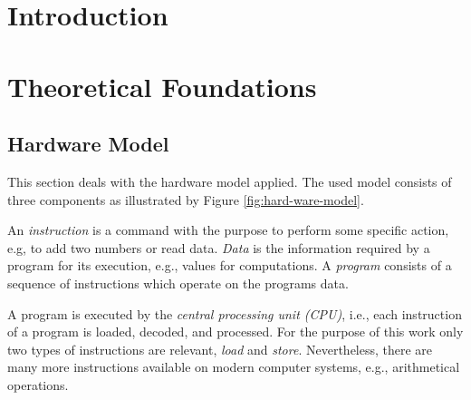 \documentclass[onecolumn, openany, master, english, seal, signatures]{dbrgrptt}
\begin{document}

%
\thesisdate{\today}%
%
%

\frontmatter%

%

\mainmatter%

\chapter{Introduction}\label{cha:introduction}

\chapter{Theoretical Foundations}\label{cha:theoretical-foundations}

\section{Hardware Model}\label{sec:hardware-model}
This section deals with the hardware model applied. The used model consists of three components as illustrated by Figure \ref{fig:hard-ware-model}.

An \emph{instruction} is a command with the purpose to perform some specific action, e.g, to add two numbers or read data. \emph{Data} is the information required by a program for its execution, e.g., values for computations.
A \emph{program} consists of a sequence of instructions which operate on the programs data.

A program is executed by the \emph{central processing unit (\ac{CPU})}, i.e., each instruction of a program is loaded, decoded, and processed. For the purpose of this work only two types of instructions are relevant, \emph{load} and \emph{store}. Nevertheless, there are many more instructions available on modern computer systems, e.g., arithmetical operations.
\end{document}
